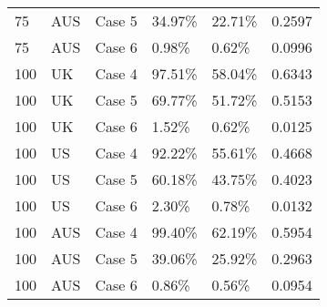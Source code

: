 \begin{table}[ht]
\begin{tabular}{llllll}
  75 & AUS & Case 5 & 34.97\% & 22.71\% & 0.2597 \\ 
  75 & AUS & Case 6 & 0.98\% & 0.62\% & 0.0996 \\ 
  100 & UK & Case 4 & 97.51\% & 58.04\% & 0.6343 \\ 
  100 & UK & Case 5 & 69.77\% & 51.72\% & 0.5153 \\ 
  100 & UK & Case 6 & 1.52\% & 0.62\% & 0.0125 \\ 
  100 & US & Case 4 & 92.22\% & 55.61\% & 0.4668 \\ 
  100 & US & Case 5 & 60.18\% & 43.75\% & 0.4023 \\ 
  100 & US & Case 6 & 2.30\% & 0.78\% & 0.0132 \\ 
  100 & AUS & Case 4 & 99.40\% & 62.19\% & 0.5954 \\ 
  100 & AUS & Case 5 & 39.06\% & 25.92\% & 0.2963 \\ 
  100 & AUS & Case 6 & 0.86\% & 0.56\% & 0.0954 \\ 
   \hline
\end{tabular}
\end{table}
